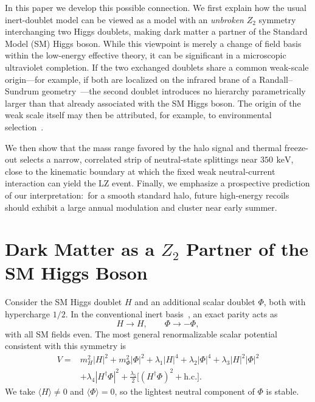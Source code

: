 \documentclass[aps,prd,twocolumn,nofootinbib,superscriptaddress]{revtex4-2}
\newcommand{\keV}{\,\mathrm{keV}}
\begin{document}
In this paper we develop this possible connection. We first explain how the usual inert-doublet model can be viewed as a model with an {\it unbroken} $Z_2$ symmetry interchanging two Higgs doublets, making dark matter a partner of the Standard Model (SM) Higgs boson. While this viewpoint is merely a change of field basis within the low-energy effective theory, it can be significant in a microscopic ultraviolet completion. If the two exchanged doublets share a common weak-scale origin---for example, if both are localized on the infrared brane of a Randall–Sundrum geometry~\cite{Randall:1999ee}---the second doublet introduces no hierarchy parametrically larger than that already associated with the SM Higgs boson. The origin of the weak scale itself may then be attributed, for example, to environmental selection~\cite{Agrawal:1997gf}.

We then show that the mass range favored by the halo signal and thermal freeze-out selects a narrow, correlated strip of neutral-state splittings near $350~\keV$, close to the kinematic boundary at which the fixed weak neutral-current interaction can yield the LZ event. Finally, we emphasize a prospective prediction of our interpretation:\ for a smooth standard halo, future high-energy recoils should exhibit a large annual modulation and cluster near early summer.


\section{Dark Matter as a {\boldmath $Z_2$} Partner of the SM Higgs Boson}

Consider the SM Higgs doublet $H$ and an additional scalar doublet $\Phi$, both with hypercharge $1/2$. In the conventional inert basis~\cite{Deshpande:1977rw,Barbieri:2006dq,LopezHonorez:2006gr}, an exact parity acts as
%
\begin{equation}
  H \longrightarrow H,
\qquad
  \Phi \longrightarrow -\Phi,
\label{eq:inert-parity}
\end{equation}
%
with all SM fields even. The most general renormalizable scalar potential consistent with this symmetry is
%
\begin{align}
  V ={}& m_H^2 |H|^2 + m_\Phi^2 |\Phi|^2 +\lambda_1 |H|^4 + \lambda_2 |\Phi|^4 +\lambda_3 |H|^2 |\Phi|^2
\nonumber\\
  & + \lambda_4 |H^\dagger\Phi|^2 + \frac{\lambda_5}{2} \bigl[(H^\dagger\Phi)^2 + \mathrm{h.c.}\bigr].
\label{eq:potential}
\end{align}
%
We take $\langle H \rangle \ne 0$ and $\langle \Phi \rangle = 0$, so the lightest neutral component of $\Phi$ is stable.
\end{document}
